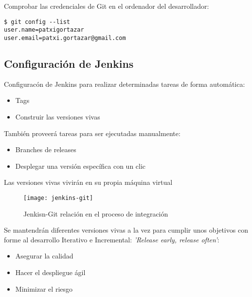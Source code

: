 \par Comprobar las credenciales de Git en el ordenador del desarrollador:

\lstset{style=bashbasico}
\begin{lstlisting}[frame=trbl]$ git config --list
user.name=patxigortazar
user.email=patxi.gortazar@gmail.com
\end{lstlisting}


\subsection{Configuración de Jenkins}
\label{sub:jenkins-configuracion}

\par Configuracón de Jenkins para realizar determinadas tareas de forma automática:

\begin{itemize}
	\item Tags
	\item Construir las versiones vivas
\end{itemize}

\par También proveerá tareas para ser ejecutadas manualmente:

\begin{itemize}
	\item Branches de releases
	\item Desplegar una versión específica con un clic
\end{itemize}

\par Las versiones vivas vivirán en su propia máquina virtual

\begin{figure}[H]
    \centering
    \texttt{[image: jenkins-git]}
    \caption{Jenkisn-Git relación en el proceso de integración}
    \label{fig:jenkins-git}
\end{figure}

\par Se mantendrán diferentes versiones vivas a la vez para cumplir unos objetivos con forme al desarrollo Iterativo e Incremental: \emph{'Release early, release often'}:

\begin{itemize}
	\item Asegurar la calidad
	\item Hacer el despliegue ágil
	\item Minimizar el riesgo
\end{itemize}

